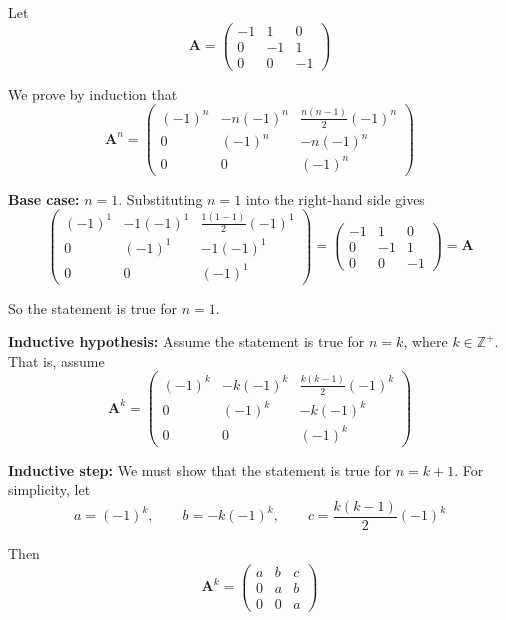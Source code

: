 \documentclass[leqno]{article}
\begin{document}
\begin{enumerate}[
  label=\textbf{\arabic*.},
  leftmargin=*,
  topsep=0pt,
  partopsep=0pt,
  parsep=0pt
]
\vspace*{10pt}

\begin{djsSolution}
Let
\[
\mathbf{A}=
\begin{pmatrix}
-1 & 1 & 0\\
0 & -1 & 1\\
0 & 0 & -1
\end{pmatrix}
\]

We prove by induction that
\[
\mathbf{A}^{n}=
\begin{pmatrix}
(-1)^{n} & -n(-1)^{n} & \frac{n(n-1)}{2}(-1)^{n}\\
0 & (-1)^{n} & -n(-1)^{n}\\
0 & 0 & (-1)^{n}
\end{pmatrix}
\]

\textbf{Base case:} \(n=1\). Substituting \(n=1\) into the right-hand side gives
\[
\begin{pmatrix}
(-1)^{1} & -1(-1)^{1} & \frac{1(1-1)}{2}(-1)^{1}\\
0 & (-1)^{1} & -1(-1)^{1}\\
0 & 0 & (-1)^{1}
\end{pmatrix}
=
\begin{pmatrix}
-1 & 1 & 0\\
0 & -1 & 1\\
0 & 0 & -1
\end{pmatrix}
=\mathbf{A}
\]

So the statement is true for \(n=1\).

\textbf{Inductive hypothesis:} Assume the statement is true for \(n=k\), where \(k\in\mathbb{Z}^+\). That is, assume
\[
\mathbf{A}^{k}=
\begin{pmatrix}
(-1)^{k} & -k(-1)^{k} & \frac{k(k-1)}{2}(-1)^{k}\\
0 & (-1)^{k} & -k(-1)^{k}\\
0 & 0 & (-1)^{k}
\end{pmatrix}
\]

\textbf{Inductive step:} We must show that the statement is true for \(n=k+1\). For simplicity, let
\[
a=(-1)^{k}, \qquad b=-k(-1)^{k}, \qquad c=\dfrac{k(k-1)}{2}(-1)^{k}
\]

Then
\[
\mathbf{A}^{k}=
\begin{pmatrix}
a & b & c\\
0 & a & b\\
0 & 0 & a
\end{pmatrix}
\]


\end{djsSolution}
\end{enumerate}
\end{document}
